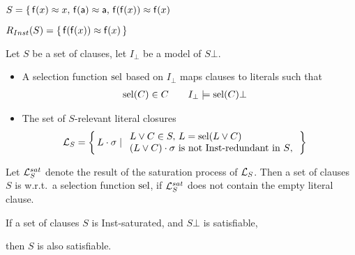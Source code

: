 \begin{example}
   \( S =
       \{ \,
       \mathsf{f}(x)\approx x,\,
       \mathsf{f}(\mathsf{a})\approx \mathsf{a},\,
       \mathsf{f}(\mathsf{f}(x))\approx\mathsf{f}(x)
       \,  \)

   \( R_{Inst}(S) = \{ \, \mathsf{f}(\mathsf{f}(x))\approx\mathsf{f}(x) \, \} \)
   \end{example}

   \begin{definition}[S-Relevance]
        Let \( S \) be a set of clauses, let \( I_\bot \) be a model of \( S\bot \).

       \begin{itemize}
           \item
        A selection function \( \operatorname{sel} \) based on \( I_\bot \) 
        maps clauses to literals such that
       \begin{align*}
           \operatorname{sel}(C)&\in C
            &&&
            I_\bot&\models\operatorname{sel}(C)\bot
       \end{align*}

       \item
        The set of \( S \)-relevant literal closures
       \begin{align*}
           \mathcal{L}_S &= \left \{ \, L\cdot\sigma \mid
           \begin{array}{l}
                L\lor C\in S,\,L = \operatorname{sel}(L\lor C)\\
                (L\lor C)\cdot\sigma\text{ is not Inst-redundant in \(S\)},\\
           \end{array}
           \, \right \}
       \end{align*}




   \end{itemize}
\end{definition}

\begin{definition}
    Let \( \mathcal{L}_S^{sat} \) denote the result of the saturation process of \( \mathcal{L}_S \).
    Then a set of clauses \( S \) is  w.r.t.~a selection function \( \operatorname{sel} \),
            if \( \mathcal{L}_S^{sat} \) does not contain the empty literal clause.
\end{definition}

       \begin{theorem}\label{theorem:inst:saturated:satisfiable}
        If a set of clauses \( S \) is Inst-saturated,
        and \( S\bot \) is satisfiable,

        then \( S \) is also satisfiable.
       \end{theorem}

